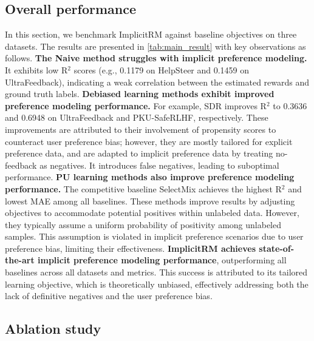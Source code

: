 \documentclass[]{arxiv_singlecolumn}
\theoremstyle{plain}
\theoremstyle{definition}
\theoremstyle{remark}
\begin{document}
\subsection{Overall performance}\label{sec:overall}

In this section, we benchmark ImplicitRM against baseline objectives on three datasets. The results are presented in \autoref{tab:main_result} with key observations as follows.
 \textbf{The Naive method struggles with implicit preference modeling.} It exhibits low R$^2$ scores (e.g., 0.1179 on HelpSteer and 0.1459 on UltraFeedback), indicating a weak correlation between the estimated rewards and ground truth labels.
 \textbf{Debiased learning methods exhibit improved preference modeling performance.} For example, SDR improves R$^2$ to 0.3636 and 0.6948 on UltraFeedback and PKU-SafeRLHF, respectively. These improvements are attributed to their involvement of propensity scores to counteract user preference bias; however, they are mostly tailored for explicit preference data, and are adapted to implicit preference data by treating no-feedback as negatives. It introduces false negatives, leading to suboptimal performance.
 \textbf{PU learning methods also improve preference modeling performance.} The competitive baseline SelectMix achieves the highest R$^2$ and lowest MAE among all baselines. These methods improve results by adjusting objectives to accommodate potential positives within unlabeled data. However, they typically assume a uniform probability of positivity among unlabeled samples. This assumption is violated in implicit preference scenarios due to user preference bias, limiting their effectiveness.
 \textbf{ImplicitRM achieves state-of-the-art implicit preference modeling performance}, outperforming all baselines across all datasets and metrics. This success is attributed to its tailored learning objective, which is theoretically unbiased, effectively addressing both the lack of definitive negatives and the user preference bias.




\subsection{Ablation study}\label{sec:ablation}
\end{document}
